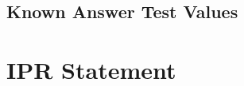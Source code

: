 \documentclass{llncs}
\newcommand{\<}{\langle}
\renewcommand{\>}{\rangle}
\begin{document}
\subsection{Known Answer Test Values}




\section{IPR Statement}



\end{document}
